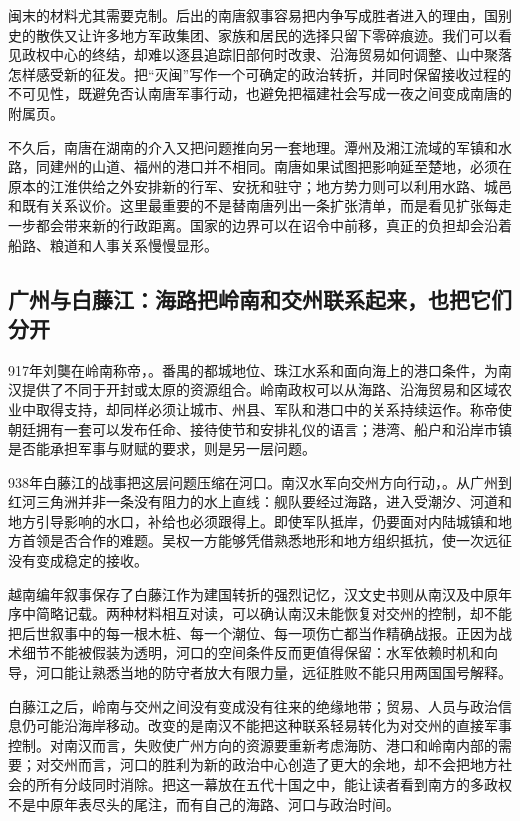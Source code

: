 闽末的材料尤其需要克制。后出的南唐叙事容易把内争写成胜者进入的理由，国别史的散佚又让许多地方军政集团、家族和居民的选择只留下零碎痕迹。我们可以看见政权中心的终结，却难以逐县追踪旧部何时改隶、沿海贸易如何调整、山中聚落怎样感受新的征发。把“灭闽”写作一个可确定的政治转折，并同时保留接收过程的不可见性，既避免否认南唐军事行动，也避免把福建社会写成一夜之间变成南唐的附属页。

不久后，南唐在湖南的介入又把问题推向另一套地理。潭州及湘江流域的军镇和水路，同建州的山道、福州的港口并不相同。南唐如果试图把影响延至楚地，必须在原本的江淮供给之外安排新的行军、安抚和驻守；地方势力则可以利用水路、城邑和既有关系议价。这里最重要的不是替南唐列出一条扩张清单，而是看见扩张每走一步都会带来新的行政距离。国家的边界可以在诏令中前移，真正的负担却会沿着船路、粮道和人事关系慢慢显形。

\subsection{广州与白藤江：海路把岭南和交州联系起来，也把它们分开}

917年刘龑在岭南称帝，。番禺的都城地位、珠江水系和面向海上的港口条件，为南汉提供了不同于开封或太原的资源组合。岭南政权可以从海路、沿海贸易和区域农业中取得支持，却同样必须让城市、州县、军队和港口中的关系持续运作。称帝使朝廷拥有一套可以发布任命、接待使节和安排礼仪的语言；港湾、船户和沿岸市镇是否能承担军事与财赋的要求，则是另一层问题。

938年白藤江的战事把这层问题压缩在河口。南汉水军向交州方向行动，。从广州到红河三角洲并非一条没有阻力的水上直线：舰队要经过海路，进入受潮汐、河道和地方引导影响的水口，补给也必须跟得上。即使军队抵岸，仍要面对内陆城镇和地方首领是否合作的难题。吴权一方能够凭借熟悉地形和地方组织抵抗，使一次远征没有变成稳定的接收。

越南编年叙事保存了白藤江作为建国转折的强烈记忆，汉文史书则从南汉及中原年序中简略记载。两种材料相互对读，可以确认南汉未能恢复对交州的控制，却不能把后世叙事中的每一根木桩、每一个潮位、每一项伤亡都当作精确战报。正因为战术细节不能被假装为透明，河口的空间条件反而更值得保留：水军依赖时机和向导，河口能让熟悉当地的防守者放大有限力量，远征胜败不能只用两国国号解释。

白藤江之后，岭南与交州之间没有变成没有往来的绝缘地带；贸易、人员与政治信息仍可能沿海岸移动。改变的是南汉不能把这种联系轻易转化为对交州的直接军事控制。对南汉而言，失败使广州方向的资源要重新考虑海防、港口和岭南内部的需要；对交州而言，河口的胜利为新的政治中心创造了更大的余地，却不会把地方社会的所有分歧同时消除。把这一幕放在五代十国之中，能让读者看到南方的多政权不是中原年表尽头的尾注，而有自己的海路、河口与政治时间。

